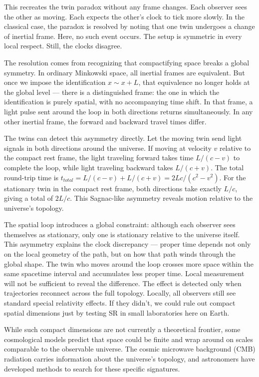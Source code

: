 This recreates the twin paradox without any frame changes. Each observer sees the other as moving. Each expects the other's clock to tick more slowly. In the classical case, the paradox is resolved by noting that one twin undergoes a change of inertial frame. Here, no such event occurs. The setup is symmetric in every local respect. Still, the clocks disagree.

The resolution comes from recognizing that compactifying space breaks a global symmetry. In ordinary Minkowski space, all inertial frames are equivalent. But once we impose the identification $x \sim x + L$, that equivalence no longer holds at the global level — there is a distinguished frame: the one in which the identification is purely spatial, with no accompanying time shift. In that frame, a light pulse sent around the loop in both directions returns simultaneously. In any other inertial frame, the forward and backward travel times differ.

The twins can detect this asymmetry directly. Let the moving twin send light signals in both directions around the universe. If moving at velocity $v$ relative to the compact rest frame, the light traveling forward takes time $L/(c-v)$ to complete the loop, while light traveling backward takes $L/(c+v)$. The total round-trip time is $t_{total} = L/(c-v) + L/(c+v) = 2Lc/(c^2-v^2)$. For the stationary twin in the compact rest frame, both directions take exactly $L/c$, giving a total of $2L/c$. This Sagnac-like asymmetry reveals motion relative to the universe's topology.

The spatial loop introduces a global constraint: although each observer sees themselves as stationary, only one is stationary relative to the universe itself. This asymmetry explains the clock discrepancy — proper time depends not only on the local geometry of the path, but on how that path winds through the global shape. The twin who moves around the loop crosses more space within the same spacetime interval and accumulates less proper time. Local measurement will not be sufficient to reveal the difference. The effect is detected only when trajectories reconnect across the full topology. Locally, all observers still see standard special relativity effects. If they didn't, we could rule out compact spatial dimensions just by testing SR in small laboratories here on Earth.

While such compact dimensions are not currently a theoretical frontier, some cosmological models predict that space could be finite and wrap around on scales comparable to the observable universe. The cosmic microwave background (CMB) radiation carries information about the universe's topology, and astronomers have developed methods to search for these specific signatures.

